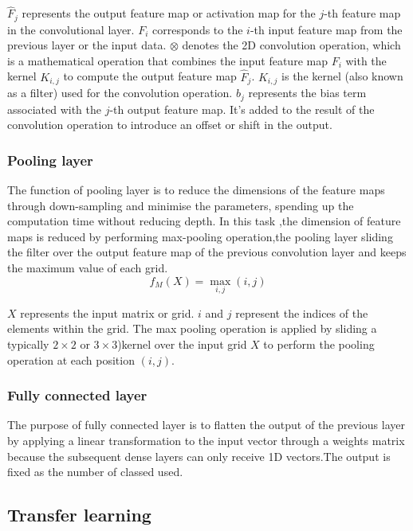 \documentclass[10pt,twocolumn,letterpaper]{article}
\begin{document}
$\hat{F}_{j}$ represents the output feature map or activation map for the $j$-th feature map in the convolutional layer. 
$F_{i}$ corresponds to the $i$-th input feature map from the previous layer or the input data.
$\otimes$ denotes the 2D convolution operation, which is a mathematical operation that combines the input feature map $F_{i}$ with the kernel $K_{i,j}$ to compute the output feature map $\hat{F}_{j}$. 
$K_{i,j}$ is the kernel (also known as a filter) used for the convolution operation. 
$b_{j}$ represents the bias term associated with the $j$-th output feature map. It's added to the result of the convolution operation to introduce an offset or shift in the output.

\subsubsection{ Pooling layer} 
The function of pooling layer is to reduce the dimensions of the feature maps through down-sampling and minimise the parameters, spending up the computation time without reducing depth. In this task ,the dimension of feature maps is reduced by performing max-pooling operation,the pooling layer sliding the filter over the output feature map of the previous convolution layer and keeps the maximum value of each grid\cite{scherer2010evaluation}.
\begin{equation}
    f_M(X) = \max_{i,j}(i,j)
\end{equation}

$X$ represents the input matrix or grid.
$i$ and $j$ represent the indices of the elements within the grid. The max pooling operation is applied by sliding a typically $2 \times 2$ or $3 \times 3$)kernel over the input grid $X$ to perform the pooling operation at each position $(i, j)$.

\subsubsection{ Fully connected layer} 
The purpose of fully connected layer is to flatten the output of the previous layer by applying a linear transformation to the input vector through a weights matrix because the subsequent dense layers can only receive 1D vectors.The output is fixed as the number of classed used. 

\subsection{Transfer learning }
\end{document}
